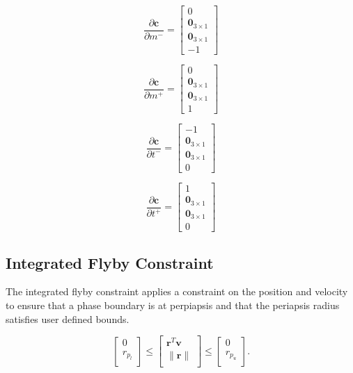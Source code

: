 \begin{equation}
\frac{\partial  \boldsymbol{c}}{\partial  m^-} = \begin{bmatrix}
0\\\boldsymbol{0}_{3 \times 1}\\\boldsymbol{0}_{3 \times 1}\\-1
\end{bmatrix}
\end{equation}

\begin{equation}
\frac{\partial  \boldsymbol{c}}{\partial  m^+} = \begin{bmatrix}
0\\\boldsymbol{0}_{3 \times 1}\\\boldsymbol{0}_{3 \times 1}\\1
\end{bmatrix}
\end{equation}


\begin{equation}
\frac{\partial  \boldsymbol{c}}{\partial  t^-} = \begin{bmatrix}
-1\\\boldsymbol{0}_{3 \times 1}\\\boldsymbol{0}_{3 \times 1}\\0
\end{bmatrix}
\end{equation}

\begin{equation}
\frac{\partial  \boldsymbol{c}}{\partial  t^+} = \begin{bmatrix}
1\\\boldsymbol{0}_{3 \times 1}\\\boldsymbol{0}_{3 \times 1}\\0
\end{bmatrix}
\end{equation}

\subsection{Integrated Flyby Constraint}

The integrated flyby constraint applies a constraint on the position and velocity to ensure that a phase boundary is at perpiapsis and that the periapsis radius satisfies
user defined bounds.

%
\begin{equation}
\begin{bmatrix}
   0 \\
   r_{p_l} \\
\end{bmatrix}
\leq
\begin{bmatrix}
   \mathbf{r}^T  \mathbf{v} \\
   \|\mathbf{r} \|  \\
\end{bmatrix}
\leq
\begin{bmatrix}
   0 \\
   r_{p_u} \\
\end{bmatrix}.
\end{equation}

